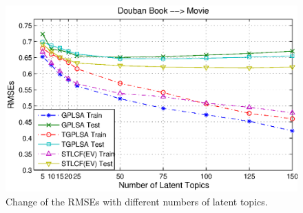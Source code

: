 \begin{figure}
\begin{minipage}[t]{0.95\linewidth}
\includegraphics[width=6.5in]{fig/douban_k.eps}
\end{minipage}
\caption{Change of the RMSEs with different numbers of latent topics.}\label{fig:k}
\end{figure}
